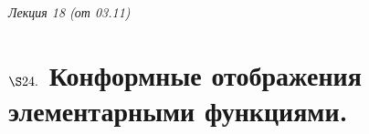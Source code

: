 \begin{flushright}
    \textit{Лекция 18 (от 03.11)}
\end{flushright}
\section{$\S 24.$ Конформные отображения элементарными функциями.}

